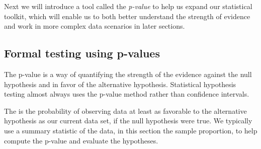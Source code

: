 Next we will introduce a tool called the \emph{p-value}
to help us expand our statistical toolkit, which will
enable us to both better understand the strength of
evidence and work in more complex data scenarios in
later sections.




\subsection{Formal testing using p-values}

\label{pValue}


The p-value is a way of quantifying the strength of the
evidence against the null hypothesis and in favor of the
alternative hypothesis.
Statistical hypothesis testing almost always uses the
p-value method rather than confidence intervals.

\begin{termBox}{
  The 
  is the probability of observing data at least as favorable
  to the alternative hypothesis as our current data set,
  if the null hypothesis were true. We typically use a summary
  statistic of the data, in this section the sample proportion,
  to help compute the p-value and evaluate the hypotheses.}
\end{termBox}



